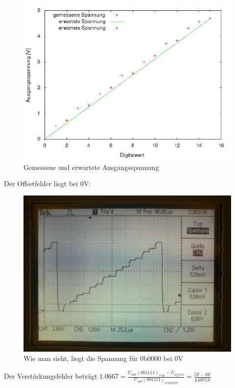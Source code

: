 \begin{figure}[H]
	\centering
	\includegraphics[width=\linewidth]{versuch9/versuch_9_1.png}
	\caption{Gemessene und erwartete Ausgangsspannung}
\end{figure}
Der Offsetfehler liegt bei 0V:
\begin{figure}[H]
	\centering
	\includegraphics[width=\linewidth]{versuch9/oszi/DSC_0604.JPG}
	\caption{Wie man sieht, liegt die Spannung für 0b0000 bei 0V}
\end{figure}
Der Verstärkungsfehler beträgt $ 1.0667 = \frac{U_{out}(0b1111)_{real} - U_{offset}}{U_{out}(0b1111)_{erwartet}} = \frac{5V - 0V}{4.6875V} $

